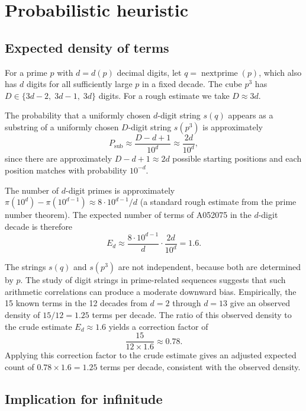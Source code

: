 \documentclass[11pt]{article}
\theoremstyle{definition}
\theoremstyle{remark}
\newcommand{\np}{\operatorname{nextprime}}
\begin{document}
\section{Probabilistic heuristic}
\label{sec:heuristic}

\subsection{Expected density of terms}
\label{sec:density}

For a prime $p$ with $d = d(p)$ decimal digits, let $q = \np(p)$,
which also has $d$ digits for all sufficiently large $p$ in a fixed
decade.
The cube $p^3$ has $D \in \{3d - 2,\; 3d - 1,\; 3d\}$ digits.
For a rough estimate we take $D \approx 3d$.

The probability that a uniformly chosen $d$-digit string $s(q)$
appears as a substring of a uniformly chosen $D$-digit string
$s(p^3)$ is approximately
\begin{equation}
P_{\mathrm{sub}} \approx \frac{D - d + 1}{10^d} \approx \frac{2d}{10^d},
\label{eq:psub}
\end{equation}
since there are approximately $D - d + 1 \approx 2d$ possible starting
positions and each position matches with probability $10^{-d}$.

The number of $d$-digit primes is approximately
$\pi(10^d) - \pi(10^{d-1}) \approx 8 \cdot 10^{d-1} / d$
(a standard rough estimate from the prime number theorem).
The expected number of terms of A052075 in the $d$-digit
decade is therefore
\begin{equation}
E_d \approx \frac{8 \cdot 10^{d-1}}{d} \cdot \frac{2d}{10^d} = 1.6.
\label{eq:Ed_raw}
\end{equation}

The strings $s(q)$ and $s(p^3)$ are not independent, because both are
determined by $p$.
The study of digit strings in prime-related sequences \cite{Dudek2014}
suggests that such arithmetic correlations can produce a moderate
downward bias.
Empirically, the 15 known terms in the 12 decades from $d = 2$ through
$d = 13$ give an observed density of $15/12 = 1.25$ terms per decade.
The ratio of this observed density to the crude estimate
$E_d \approx 1.6$ yields a correction factor of
\[
\frac{15}{12 \times 1.6} \approx 0.78.
\]
Applying this correction factor to the crude estimate gives an
adjusted expected count of $0.78 \times 1.6 = 1.25$ terms per
decade, consistent with the observed density.

\subsection{Implication for infinitude}
\label{sec:infinitude}
\end{document}
